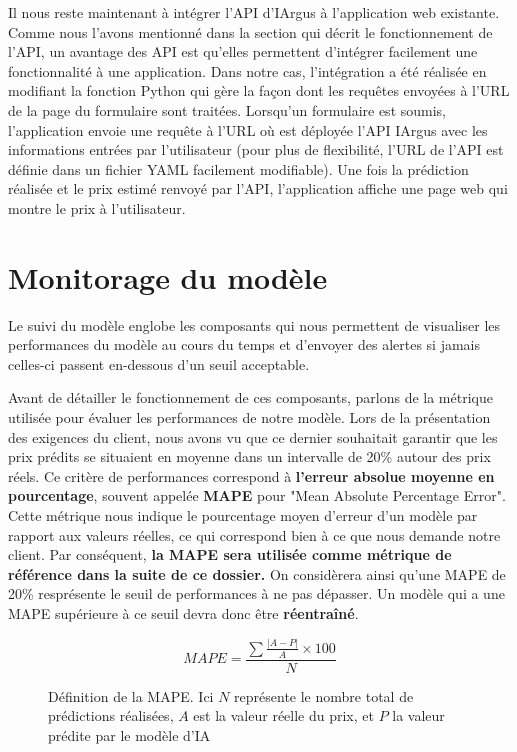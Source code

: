 \documentclass[french]{article}
\begin{document}
    Il nous reste maintenant à intégrer l'API d'IArgus à l'application web existante. Comme nous l'avons mentionné dans la section qui décrit le fonctionnement de l'API, un avantage des API est qu'elles permettent d'intégrer facilement une fonctionnalité à une application. Dans notre cas, l'intégration a été réalisée en modifiant la fonction Python qui gère la façon dont les requêtes envoyées à l'URL de la page du formulaire sont traitées. Lorsqu'un formulaire est soumis, l'application envoie une requête à l'URL où est déployée l'API IArgus avec les informations entrées par l'utilisateur (pour plus de flexibilité, l'URL de l'API est définie dans un fichier YAML facilement modifiable). Une fois la prédiction réalisée et le prix estimé renvoyé par l'API, l'application affiche une page web qui montre le prix à l'utilisateur.

    \section{Monitorage du modèle}

    Le suivi du modèle englobe les composants qui nous permettent de visualiser les performances du modèle au cours du temps et d'envoyer des alertes si jamais celles-ci passent en-dessous d'un seuil acceptable. 
    
    Avant de détailler le fonctionnement de ces composants, parlons de la métrique utilisée pour évaluer les performances de notre modèle. Lors de la présentation des exigences du client, nous avons vu que ce dernier souhaitait garantir que les prix prédits se situaient en moyenne dans un intervalle de 20\% autour des prix réels. Ce critère de performances correspond à \textbf{l'erreur absolue moyenne en pourcentage}, souvent appelée \textbf{MAPE} pour "Mean Absolute Percentage Error". Cette métrique nous indique le pourcentage moyen d'erreur d'un modèle par rapport aux valeurs réelles, ce qui correspond bien à ce que nous demande notre client. Par conséquent, \textbf{la MAPE sera utilisée comme métrique de référence dans la suite de ce dossier.} On considèrera ainsi qu'une MAPE de 20\% resprésente le seuil de performances à ne pas dépasser. Un modèle qui a une MAPE supérieure à ce seuil devra donc être \textbf{réentraîné}.

    \begin{figure}[h!]
        \begin{equation}MAPE = \frac {\sum \frac{\lvert A-P \rvert}{A} \times 100}{N}  \end{equation}
        \centering
        \caption{Définition de la MAPE. Ici $N$ représente le nombre total de prédictions réalisées, $A$ est la valeur réelle du prix, et $P$ la valeur prédite par le modèle d'IA}
        \centering
    \end{figure}
\end{document}
